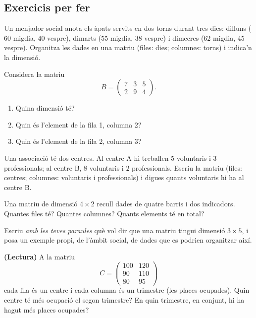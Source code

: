 \subsection{Exercicis per fer}

\begin{exercicis}
\begin{exlist}
  \item Un menjador social anota els àpats servits en dos torns durant
        tres dies: dilluns ($60$ migdia, $40$ vespre), dimarts ($55$ migdia,
        $38$ vespre) i dimecres ($62$ migdia, $45$ vespre). Organitza les
        dades en una matriu (files: dies; columnes: torns) i indica'n la dimensió.
  \item Considera la matriu
        \[ B=\begin{pmatrix} 7 & 3 & 5 \\ 2 & 9 & 4 \end{pmatrix}. \]
        \begin{enumerate}[label=\alph*), leftmargin=1.6em, topsep=2pt]
          \item Quina dimensió té?
          \item Quin és l'element de la fila 1, columna 2?
          \item Quin és l'element de la fila 2, columna 3?
        \end{enumerate}
  \item Una associació té dos centres. Al centre A hi treballen $5$ voluntaris
        i $3$ professionals; al centre B, $8$ voluntaris i $2$ professionals.
        Escriu la matriu (files: centres; columnes: voluntaris i professionals)
        i digues quants voluntaris hi ha al centre B.
  \item Una matriu de dimensió $4\times 2$ recull dades de quatre barris i dos
        indicadors. Quantes files té? Quantes columnes? Quants elements té
        en total?
  \item Escriu \emph{amb les teves paraules} què vol dir que una matriu tingui
        dimensió $3\times 5$, i posa un exemple propi, de l'àmbit social, de
        dades que es podrien organitzar així.
  \item \textbf{(Lectura)} A la matriu
        \[ C=\begin{pmatrix} 100 & 120 \\ 90 & 110 \\ 80 & 95 \end{pmatrix} \]
        cada fila és un centre i cada columna és un trimestre (les places
        ocupades). Quin centre té més ocupació el segon trimestre? En quin
        trimestre, en conjunt, hi ha hagut més places ocupades?
\end{exlist}
\end{exercicis}

